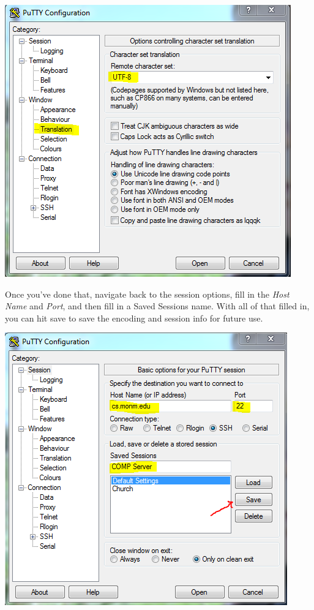 \documentclass[]{tufte-handout}
\begin{document}
\vspace{.1in}
\begin{center}
\includegraphics[scale=.75]{Putty-SetUTF8.PNG}
\end{center}
\vspace{.1in}

Once you've done that, navigate back to the session options, fill in the \textit{Host Name} and \textit{Port}, and then fill in a Saved Sessions name. With all of that filled in, you can hit save to save the encoding and session info for future use.

\vspace{.1in}
\begin{center}
\includegraphics[scale=.75]{Putty-SaveSettings.PNG}
\end{center}
\vspace{.1in}
\end{document}
